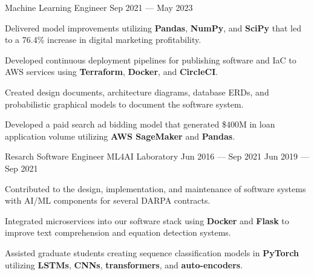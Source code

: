 \begin{cventries}
  \cventry
    {Machine Learning Engineer} %
    {} %
    {} %
    {Sep 2021 --- May 2023} %
    {
      \vspace{-0.1cm}
      \begin{cvitems} %
        \item Delivered model improvements utilizing \textbf{Pandas}, \textbf{NumPy}, and \textbf{SciPy} that led to a 76.4\% increase in digital marketing profitability.
        \item Developed continuous deployment pipelines for publishing software and IaC to AWS services using \textbf{Terraform}, \textbf{Docker}, and \textbf{CircleCI}.
        \item Created design documents, architecture diagrams, database ERDs, and probabilistic graphical models to document the software system.
        \item Developed a paid search ad bidding model that generated \$400M in loan application volume utilizing \textbf{AWS SageMaker} and \textbf{Pandas}. 
      \end{cvitems}
    }
  \vspace{.2cm}
  \cventry
    {Resarch Software Engineer} %
    {ML4AI Laboratory} %
    {Jun 2016 --- Sep 2021} %
    {Jun 2019 --- Sep 2021} %
    {
      \vspace{-0.1cm}
      \begin{cvitems} %
        \item Contributed to the design, implementation, and maintenance of software systems with AI/ML components for several DARPA contracts.
        \item Integrated microservices into our software stack using \textbf{Docker} and \textbf{Flask} to improve text comprehension and equation detection systems.
        \item Assisted graduate students creating sequence classification models in \textbf{PyTorch} utilizing \textbf{LSTMs}, \textbf{CNNs}, \textbf{transformers}, and \textbf{auto-encoders}.

\end{cvitems}}
\end{cventries}
